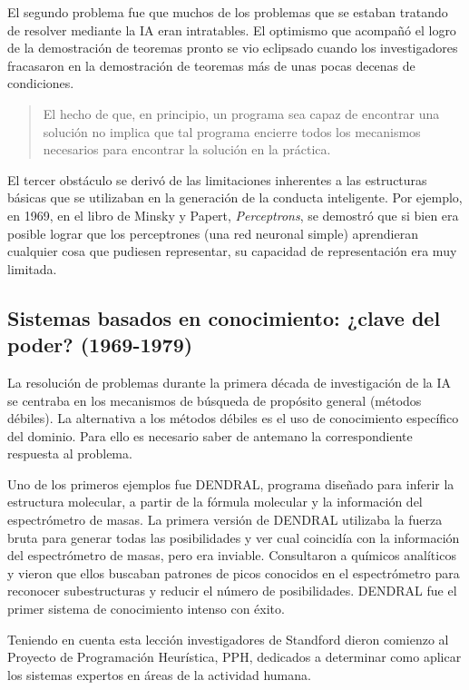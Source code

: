 \documentclass[12pt,a4paper]{article}
\begin{document}
El segundo problema fue que muchos de los problemas que se estaban tratando de resolver mediante la IA eran intratables. El optimismo que acompañó el logro de la demostración de teoremas pronto se vio eclipsado cuando los investigadores fracasaron en la demostración de teoremas más de unas pocas decenas de condiciones. \begin{quote}\small El hecho de que, en principio, un programa sea capaz de encontrar una solución no implica que tal programa encierre todos los mecanismos necesarios para encontrar la solución en la práctica.\end{quote}

El tercer obstáculo se derivó de las limitaciones inherentes a las estructuras básicas que se utilizaban en la generación de la conducta inteligente. Por ejemplo, en 1969, en el libro de Minsky y Papert, \emph{Perceptrons}, se demostró que si bien era posible lograr que los perceptrones (una red neuronal simple) aprendieran cualquier cosa que pudiesen representar, su capacidad de representación era muy limitada.

\subsection{Sistemas basados en conocimiento: ¿clave del poder? (1969-1979)}
La resolución de problemas durante la primera década de investigación de la IA se centraba en los mecanismos de búsqueda de propósito general (métodos débiles). La alternativa a los métodos débiles es el uso de conocimiento específico del dominio. Para ello es necesario saber de antemano la correspondiente respuesta al problema.

Uno de los primeros ejemplos fue DENDRAL, programa diseñado para inferir la estructura molecular, a partir de la fórmula molecular y la información del espectrómetro de masas. La primera versión de DENDRAL utilizaba la fuerza bruta para generar todas las posibilidades y ver cual coincidía con la información del espectrómetro de masas, pero era inviable. Consultaron a químicos analíticos y vieron que ellos buscaban patrones de picos conocidos en el espectrómetro para reconocer subestructuras y reducir el número de posibilidades. DENDRAL fue el primer sistema de conocimiento intenso con éxito.

Teniendo en cuenta esta lección investigadores de Standford dieron comienzo al Proyecto de Programación Heurística, PPH, dedicados a determinar como aplicar los sistemas expertos en áreas de la actividad humana.
\end{document}
